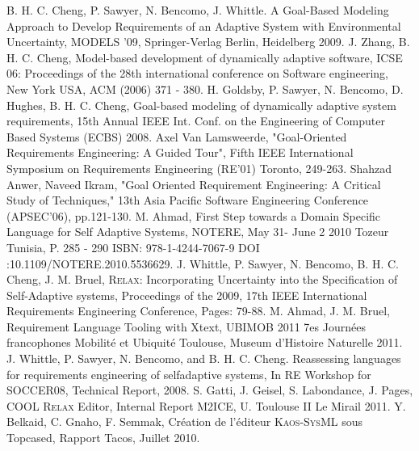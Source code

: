 \documentclass[10pt, conference, compsocconf]{IEEEtran}
\def\myrelax{\textsc{Relax}}                  %
\def\sysml{\textsc{SysML}}
\def\kaos{\textsc{Kaos}}
\begin{document}


\begin{thebibliography}{1}
B. H. C. Cheng, P. Sawyer, N. Bencomo, J. Whittle. A Goal-Based Modeling Approach to Develop Requirements of an Adaptive System with Environmental Uncertainty, MODELS '09, Springer-Verlag Berlin, Heidelberg 2009.
J. Zhang, B. H. C. Cheng, Model-based development of dynamically adaptive software, ICSE 06: Proceedings of the 28th international conference on Software engineering, New York USA, ACM (2006) 371 - 380.
H. Goldsby, P.  Sawyer, N. Bencomo, D. Hughes, B. H. C. Cheng, Goal-based modeling of dynamically adaptive system requirements, 15th Annual IEEE Int. Conf. on the Engineering of Computer Based Systems (ECBS) 2008.
Axel Van Lamsweerde, "Goal-Oriented Requirements Engineering: A Guided Tour", Fifth IEEE International Symposium on Requirements Engineering (RE'01) Toronto, 249-263.
Shahzad Anwer, Naveed Ikram, "Goal Oriented Requirement Engineering: A Critical Study of Techniques," 13th Asia Pacific Software Engineering Conference (APSEC'06), pp.121-130.
M. Ahmad, First Step towards a Domain Specific Language for Self Adaptive Systems, NOTERE, May 31- June 2 2010 Tozeur Tunisia, P. 285 - 290 ISBN: 978-1-4244-7067-9 DOI :10.1109/NOTERE.2010.5536629.
J. Whittle, P. Sawyer, N. Bencomo, B. H. C. Cheng, J. M. Bruel, \myrelax{}: Incorporating Uncertainty into the Specification of Self-Adaptive systems, Proceedings of the 2009, 17th IEEE International Requirements Engineering Conference, Pages: 79-88.
M. Ahmad, J. M. Bruel, Requirement Language Tooling with Xtext, UBIMOB 2011 7es Journ\'ees francophones Mobilit\'e et Ubiquit\'e Toulouse, Museum d'Histoire Naturelle 2011.
J. Whittle, P. Sawyer, N. Bencomo, and B. H. C. Cheng. Reassessing languages for requirements engineering of selfadaptive systems, In RE Workshop for SOCCER08, Technical Report, 2008.
S. Gatti, J. Geisel, S. Labondance, J. Pages, COOL \myrelax{} Editor, Internal Report M2ICE, U. Toulouse II Le Mirail 2011.
Y. Belkaid, C. Gnaho, F. Semmak, Cr\'eation de l'\'editeur \kaos{}-\sysml{} sous Topcased, Rapport Tacos, Juillet 2010.



\end{thebibliography}
\end{document}
